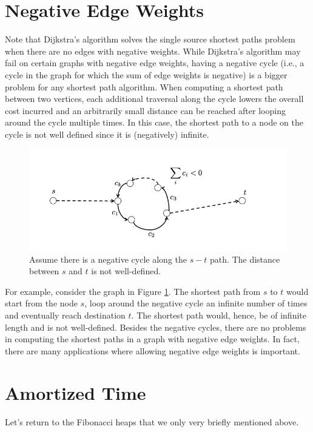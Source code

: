 \documentclass [12pt]{article}
\theoremstyle{definition}
\begin{document}
\section{Negative Edge Weights}
Note that Dijkstra's algorithm solves the single source shortest paths problem when there
are no edges with negative weights. While Dijkstra's algorithm may fail on certain graphs
with negative edge weights, having a negative cycle (i.e., a cycle in the graph for which the
sum of edge weights is negative) is a bigger problem for any shortest path algorithm. When
computing a shortest path between two vertices, each additional traversal along the cycle
lowers the overall cost incurred and an arbitrarily small distance can be reached after looping
around the cycle multiple times. In this case, the shortest path to a node on the cycle is not
well defined since it is (negatively) infinite.

\begin{figure}[h!]
\centering
\includegraphics[scale=0.5]{negative_cycle.png}
\caption{Assume there is a negative cycle along the $s-t$ path. The distance between $s$ and
$t$ is not well-defined.}
\label{fig:negative_cycle}
\end{figure}

For example, consider the graph in Figure \ref{fig:negative_cycle}. The shortest path from $s$ to $t$ would start from the node $s$, loop around the negative cycle an infinite number of times and eventually reach destination $t$. The shortest path would, hence, be of infinite length and is not well-defined. Besides the negative cycles, there are no problems in computing the shortest paths in a graph with negative edge weights. In fact, there are many applications where allowing negative edge weights is important.


\section{Amortized Time}
Let's return to the Fibonacci heaps that we only very briefly mentioned above.
\end{document}

